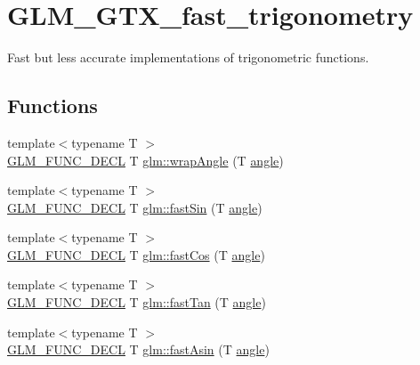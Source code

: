 \hypertarget{group__gtx__fast__trigonometry}{}\section{G\+L\+M\+\_\+\+G\+T\+X\+\_\+fast\+\_\+trigonometry}
\label{group__gtx__fast__trigonometry}


Fast but less accurate implementations of trigonometric functions.  


\subsection*{Functions}
\begin{DoxyCompactItemize}
\item 
{\footnotesize template$<$typename T $>$ }\\\mbox{\hyperlink{setup_8hpp_ab2d052de21a70539923e9bcbf6e83a51}{G\+L\+M\+\_\+\+F\+U\+N\+C\+\_\+\+D\+E\+CL}} T \mbox{\hyperlink{group__gtx__fast__trigonometry_ga069527c6dbd64f53435b8ebc4878b473}{glm\+::wrap\+Angle}} (T \mbox{\hyperlink{group__gtc__quaternion_gad4a4448baedb198b2b1e7880d2544dc9}{angle}})
\item 
{\footnotesize template$<$typename T $>$ }\\\mbox{\hyperlink{setup_8hpp_ab2d052de21a70539923e9bcbf6e83a51}{G\+L\+M\+\_\+\+F\+U\+N\+C\+\_\+\+D\+E\+CL}} T \mbox{\hyperlink{group__gtx__fast__trigonometry_ga0aab3257bb3b628d10a1e0483e2c6915}{glm\+::fast\+Sin}} (T \mbox{\hyperlink{group__gtc__quaternion_gad4a4448baedb198b2b1e7880d2544dc9}{angle}})
\item 
{\footnotesize template$<$typename T $>$ }\\\mbox{\hyperlink{setup_8hpp_ab2d052de21a70539923e9bcbf6e83a51}{G\+L\+M\+\_\+\+F\+U\+N\+C\+\_\+\+D\+E\+CL}} T \mbox{\hyperlink{group__gtx__fast__trigonometry_gab34c8b45c23c0165a64dcecfcc3b302a}{glm\+::fast\+Cos}} (T \mbox{\hyperlink{group__gtc__quaternion_gad4a4448baedb198b2b1e7880d2544dc9}{angle}})
\item 
{\footnotesize template$<$typename T $>$ }\\\mbox{\hyperlink{setup_8hpp_ab2d052de21a70539923e9bcbf6e83a51}{G\+L\+M\+\_\+\+F\+U\+N\+C\+\_\+\+D\+E\+CL}} T \mbox{\hyperlink{group__gtx__fast__trigonometry_gaf29b9c1101a10007b4f79ee89df27ba2}{glm\+::fast\+Tan}} (T \mbox{\hyperlink{group__gtc__quaternion_gad4a4448baedb198b2b1e7880d2544dc9}{angle}})
\item 
{\footnotesize template$<$typename T $>$ }\\\mbox{\hyperlink{setup_8hpp_ab2d052de21a70539923e9bcbf6e83a51}{G\+L\+M\+\_\+\+F\+U\+N\+C\+\_\+\+D\+E\+CL}} T \mbox{\hyperlink{group__gtx__fast__trigonometry_ga562cb62c51fbfe7fac7db0bce706b81f}{glm\+::fast\+Asin}} (T \mbox{\hyperlink{group__gtc__quaternion_gad4a4448baedb198b2b1e7880d2544dc9}{angle}})

\end{DoxyCompactItemize}

